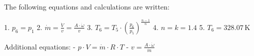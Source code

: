 The following equations and calculations are written:  

1. \( p_6 = p_1 \)  
2. \( \dot{m} = \frac{\dot{V}}{v} = \frac{A \cdot \dot{\omega}}{v} \)  
3. \( T_6 = T_5 \cdot \left( \frac{p_6}{p_5} \right)^{\frac{n-1}{n}} \)  
4. \( n = k = 1.4 \)  
5. \( T_6 = 328.07 \, \text{K} \)  

Additional equations:  
- \( p \cdot V = \dot{m} \cdot R \cdot T \)  
- \( v = \frac{A \cdot \dot{\omega}}{\dot{m}} \)
